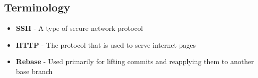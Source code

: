 \subsection{Terminology}
\begin{itemize}
\item\textbf{SSH} - A type of secure network protocol
\item\textbf{HTTP} - The protocol that is used to serve internet pages
\item\textbf{Rebase} - Used primarily for lifting commits and reapplying them to another base branch
\end{itemize}
